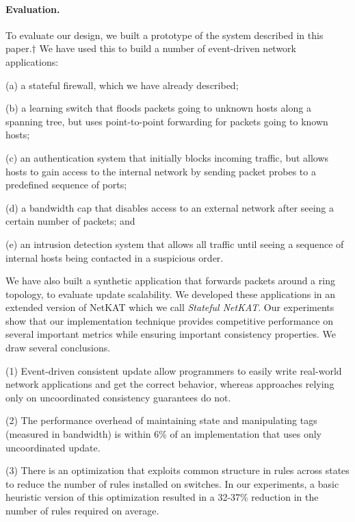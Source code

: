 \documentclass[pldi-cameraready]{sigplanconf}
\begin{document}
\paragraph*{Evaluation.}

To evaluate our design, we built a prototype of the system
described in this paper.$\dagger$
We have
used this to build a number of event-driven
network applications:
\begin{inparaenum}
\item[(a)] a stateful firewall, which we have already described; 
\item[(b)] a learning switch that floods packets going to unknown
  hosts along a spanning tree, but uses point-to-point forwarding for
  packets going to known hosts; 
\item[(c)] an authentication system that initially blocks incoming traffic, but
  allows hosts to gain access to the internal network by sending
  packet probes to a predefined sequence of ports;
\item[(d)] a bandwidth cap that disables access to an external
  network after seeing a certain number of packets; and
\item[(e)] an intrusion detection system that allows all traffic until
  seeing a sequence of internal hosts being contacted in a suspicious
  order.
\end{inparaenum}
We have also built a synthetic application that forwards
packets around a ring topology, to evaluate update scalability. We developed
these applications in an extended version of NetKAT which we call {\em Stateful NetKAT}.
Our experiments show that our implementation technique
provides competitive performance on several important metrics while
ensuring important consistency properties. We draw several conclusions.
\begin{inparaenum}
\item[(1)] Event-driven consistent update allow programmers to easily
write real-world network applications and get the correct behavior,
whereas approaches relying only on uncoordinated consistency
guarantees do not.
\item[(2)] The
performance overhead of maintaining state and manipulating tags
(measured in bandwidth) is within 6\% of an implementation
that uses only uncoordinated update.
\item[(3)] There is an
optimization that exploits common structure in rules across 
states to reduce the number of rules installed on
switches.
In our experiments, a basic heuristic version of this
optimization resulted in a 32-37\% reduction in the number of rules
required on average.
\end{inparaenum}
\end{document}
